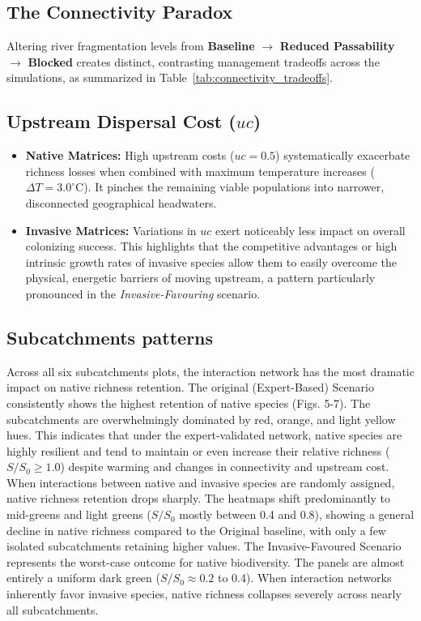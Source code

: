 \documentclass[11pt,a4paper]{article}
\begin{document}
{\subsection{The Connectivity Paradox}
Altering river fragmentation levels from \textbf{Baseline} $\rightarrow$ \textbf{Reduced Passability} $\rightarrow$ \textbf{Blocked} creates distinct, contrasting management tradeoffs across the simulations, as summarized in Table~\ref{tab:connectivity_tradeoffs}.

\subsection{Upstream Dispersal Cost ($uc$)}
\begin{itemize}
    \item \textbf{Native Matrices:} High upstream costs ($uc = 0.5$) systematically exacerbate richness losses when combined with maximum temperature increases ($\Delta T = 3.0^\circ\text{C}$). It pinches the remaining viable populations into narrower, disconnected geographical headwaters.
    \item \textbf{Invasive Matrices:} Variations in $uc$ exert noticeably less impact on overall colonizing success. This highlights that the competitive advantages or high intrinsic growth rates of invasive species allow them to easily overcome the physical, energetic barriers of moving upstream, a pattern particularly pronounced in the \textit{Invasive-Favouring} scenario.
\end{itemize}

\subsection{Subcatchments patterns}
Across all six subcatchments plots, the interaction network has the most dramatic impact on native richness retention. The original (Expert-Based) Scenario consistently shows the highest retention of native species (Figs. 5-7). The subcatchments are overwhelmingly dominated by red, orange, and light yellow hues. This indicates that under the expert-validated network, native species are highly resilient and tend to maintain or even increase their relative richness ($S/S_0 \ge 1.0$) despite warming and changes in connectivity and upstream cost. When interactions between native and invasive species are randomly assigned, native richness retention drops sharply. The heatmaps shift predominantly to mid-greens and light greens ($S/S_0$ mostly between 0.4 and 0.8), showing a general decline in native richness compared to the Original baseline, with only a few isolated subcatchments retaining higher values. The Invasive-Favoured Scenario represents the worst-case outcome for native biodiversity. The panels are almost entirely a uniform dark green ($S/S_0 \approx 0.2$ to 0.4). When interaction networks inherently favor invasive species, native richness collapses severely across nearly all subcatchments.

}
\end{document}
